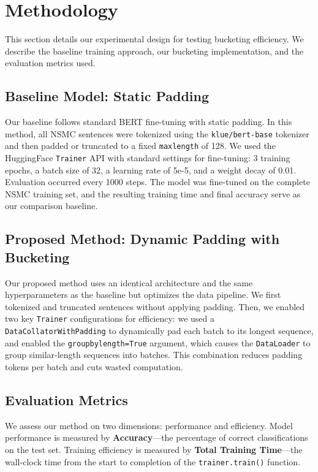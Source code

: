 \documentclass{article}
\begin{document}
\section{Methodology}

This section details our experimental design for testing bucketing efficiency. We describe the baseline training approach, our bucketing implementation, and the evaluation metrics used.

\subsection{Baseline Model: Static Padding}
Our baseline follows standard BERT fine-tuning with static padding. In this method, all NSMC sentences were tokenized using the \texttt{klue/bert-base} tokenizer and then padded or truncated to a fixed \texttt{max\textunderscore length} of 128. We used the HuggingFace \texttt{Trainer} API with standard settings for fine-tuning: 3 training epochs, a batch size of 32, a learning rate of 5e-5, and a weight decay of 0.01. Evaluation occurred every 1000 steps. The model was fine-tuned on the complete NSMC training set, and the resulting training time and final accuracy serve as our comparison baseline.

\subsection{Proposed Method: Dynamic Padding with Bucketing}
Our proposed method uses an identical architecture and the same hyperparameters as the baseline but optimizes the data pipeline. We first tokenized and truncated sentences without applying padding. Then, we enabled two key \texttt{Trainer} configurations for efficiency: we used a \texttt{DataCollatorWithPadding} to dynamically pad each batch to its longest sequence, and enabled the \texttt{group\textunderscore by\textunderscore length=True} argument, which causes the \texttt{DataLoader} to group similar-length sequences into batches. This combination reduces padding tokens per batch and cuts wasted computation.

\subsection{Evaluation Metrics}
We assess our method on two dimensions: performance and efficiency. Model performance is measured by \textbf{Accuracy}—the percentage of correct classifications on the test set. Training efficiency is measured by \textbf{Total Training Time}—the wall-clock time from the start to completion of the \texttt{trainer.train()} function.
\end{document}
